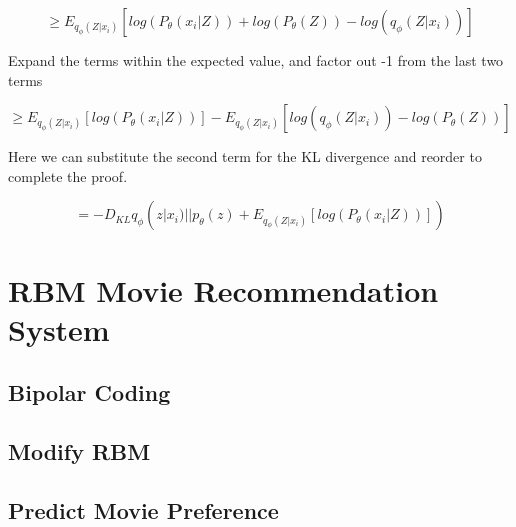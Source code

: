 \documentclass{article}
\begin{document}
\[ \geq E_{q_\phi (Z | x_i)} [log (P_\theta(x_i | Z)) + log(P_\theta(Z)) - log (q_\phi (Z | x_i))]\]

Expand the terms within the expected value, and factor out -1 from the last two terms

\[ \geq E_{q_\phi (Z | x_i)} [log (P_\theta(x_i | Z))] - E_{q_\phi (Z | x_i)}[log (q_\phi (Z | x_i)) - log(P_\theta(Z))]\]

Here we can substitute the second term for the KL divergence and reorder to complete the proof.

\[ = - D_{KL}q_\phi(z|x_i) || p_\theta(z) + E_{q_\phi (Z | x_i)} [log (P_\theta(x_i | Z))] )\]

\section{RBM Movie Recommendation System}
\subsection{Bipolar Coding}
\subsection{Modify RBM}
\subsection{Predict Movie Preference}
\end{document}
